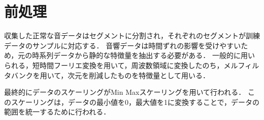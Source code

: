 \documentclass[../main]{subfiles}
\begin{document}
\section{前処理}
収集した正常な音データはセグメントに分割され，それぞれのセグメントが訓練データのサンプルに対応する．
音響データは時間ずれの影響を受けやすいため，元の時系列データから静的な特徴量を抽出する必要がある．
一般的に用いられる，短時間フーリエ変換を用いて，周波数領域に変換したのち，メルフィルタバンクを用いて，次元を削減したものを特徴量として用いる．

最終的にデータのスケーリングがMin Maxスケーリングを用いて行われる．
このスケーリングは，データの最小値を0，最大値を1に変換することで，データの範囲を統一するために行われる．
\label{sec:pmethod_preprocessing}
\end{document}
